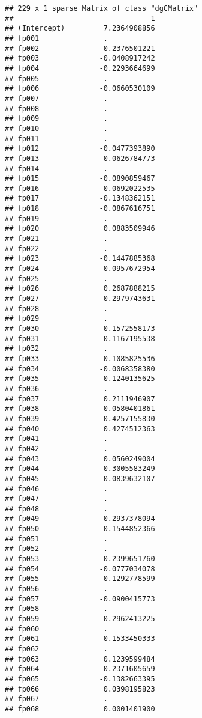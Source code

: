 \documentclass[]{article}
\begin{document}
\begin{verbatim}
## 229 x 1 sparse Matrix of class "dgCMatrix"
##                                1
## (Intercept)         7.2364908856
## fp001               .           
## fp002               0.2376501221
## fp003              -0.0408917242
## fp004              -0.2293664699
## fp005               .           
## fp006              -0.0660530109
## fp007               .           
## fp008               .           
## fp009               .           
## fp010               .           
## fp011               .           
## fp012              -0.0477393890
## fp013              -0.0626784773
## fp014               .           
## fp015              -0.0890859467
## fp016              -0.0692022535
## fp017              -0.1348362151
## fp018              -0.0867616751
## fp019               .           
## fp020               0.0883509946
## fp021               .           
## fp022               .           
## fp023              -0.1447885368
## fp024              -0.0957672954
## fp025               .           
## fp026               0.2687888215
## fp027               0.2979743631
## fp028               .           
## fp029               .           
## fp030              -0.1572558173
## fp031               0.1167195538
## fp032               .           
## fp033               0.1085825536
## fp034              -0.0068358380
## fp035              -0.1240135625
## fp036               .           
## fp037               0.2111946907
## fp038               0.0580401861
## fp039              -0.4257155830
## fp040               0.4274512363
## fp041               .           
## fp042               .           
## fp043               0.0560249004
## fp044              -0.3005583249
## fp045               0.0839632107
## fp046               .           
## fp047               .           
## fp048               .           
## fp049               0.2937378094
## fp050              -0.1544852366
## fp051               .           
## fp052               .           
## fp053               0.2399651760
## fp054              -0.0777034078
## fp055              -0.1292778599
## fp056               .           
## fp057              -0.0900415773
## fp058               .           
## fp059              -0.2962413225
## fp060               .           
## fp061              -0.1533450333
## fp062               .           
## fp063               0.1239599484
## fp064               0.2371605659
## fp065              -0.1382663395
## fp066               0.0398195823
## fp067               .           
## fp068               0.0001401900

\end{verbatim}
\end{document}
